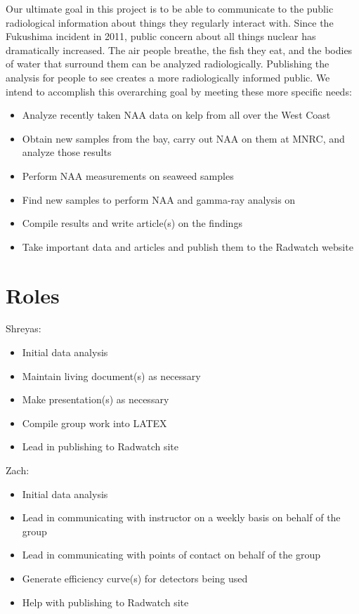 \documentclass[]{article}
\begin{document}
Our ultimate goal in this project is to be able to communicate to the public radiological information about things they regularly interact with.  Since the Fukushima incident in 2011, public concern about all things nuclear has dramatically increased.  The air people breathe, the fish they eat, and the bodies of water that surround them can be analyzed radiologically.  Publishing the analysis for people to see creates a more radiologically informed public.  We intend to accomplish this overarching goal by meeting these more specific needs:
\begin{itemize}
\item Analyze recently taken NAA data on kelp from all over the West Coast
\item Obtain new samples from the bay, carry out NAA on them at MNRC, and analyze those results
\item Perform NAA measurements on seaweed samples
\item Find new samples to perform NAA and gamma-ray analysis on
\item Compile results and write article(s) on the findings
\item Take important data and articles and publish them to the Radwatch website
\end{itemize}

\section{Roles}
Shreyas:
\begin{itemize}
\item Initial data analysis
\item Maintain living document(s) as necessary 
\item Make presentation(s) as necessary
\item Compile group work into LATEX
\item Lead in publishing to Radwatch site
\end{itemize}

Zach: 
\begin{itemize}
\item Initial data analysis
\item Lead in communicating with instructor on a weekly basis on behalf of the group
\item Lead in communicating with points of contact on behalf of the group
\item Generate efficiency curve(s) for detectors being used
\item Help with publishing to Radwatch site
\end{itemize}
\end{document}
